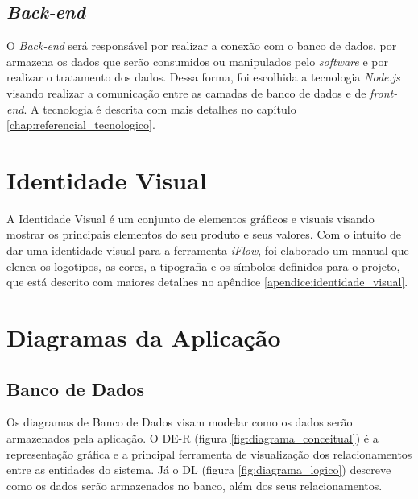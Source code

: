 \subsection{\textit{Back-end}}
O \textit{Back-end} será responsável por realizar a conexão com o banco de dados, por armazena os dados que serão consumidos ou manipulados pelo \textit{software} e por realizar o tratamento dos dados. Dessa forma, foi escolhida a tecnologia \textit{Node.js} visando realizar a comunicação entre as camadas de banco de dados e de \textit{front-end}. A tecnologia é descrita com mais detalhes no capítulo \ref{chap:referencial_tecnologico}.

\section{Identidade Visual}

A Identidade Visual é um conjunto de elementos gráficos e visuais visando mostrar os principais elementos do seu produto e seus valores. Com o intuito de dar uma identidade visual para a ferramenta \textit{iFlow}, foi elaborado um manual que elenca os logotipos, as cores, a tipografia e os símbolos definidos para o projeto, que está descrito com maiores detalhes no apêndice \ref{apendice:identidade_visual}.

\section{Diagramas da Aplicação}

\subsection{Banco de Dados}

Os diagramas de Banco de Dados visam modelar como os dados serão armazenados pela aplicação. O DE-R (figura \ref{fig:diagrama_conceitual}) é a representação gráfica e a principal ferramenta de visualização dos relacionamentos entre as entidades do sistema. Já o DL (figura \ref{fig:diagrama_logico}) descreve como os dados serão armazenados no banco, além dos seus relacionamentos.

